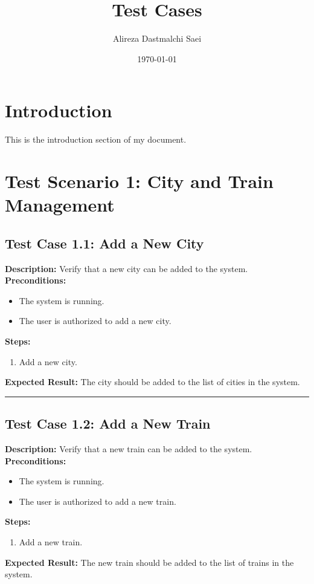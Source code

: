 \documentclass{article}
\title{Test Cases}
\author{Alireza Dastmalchi Saei}
\date{\today}
\begin{document}
\maketitle

\section{Introduction}

This is the introduction section of my document.

\pagebreak

\section{Test Scenario 1: City and Train Management}
\bigskip
\bigskip
\subsection{Test Case 1.1: Add a New City}

\textbf{Description:} Verify that a new city can be added to the system.\\
\textbf{Preconditions:}
\begin{itemize}
  \item The system is running.
  \item The user is authorized to add a new city.
\end{itemize}
\textbf{Steps:}
\begin{enumerate}
  \item Add a new city.
\end{enumerate}
\textbf{Expected Result:} The city should be added to the list of cities in the system.

\bigskip
\hrule
\bigskip


\subsection{Test Case 1.2: Add a New Train}

\textbf{Description:} Verify that a new train can be added to the system.\\
\textbf{Preconditions:}
\begin{itemize}
  \item The system is running.
  \item The user is authorized to add a new train.
\end{itemize}
\textbf{Steps:}
\begin{enumerate}
  \item Add a new train.
\end{enumerate}
\textbf{Expected Result:} The new train should be added to the list of trains in the system.

\pagebreak
\end{document}
